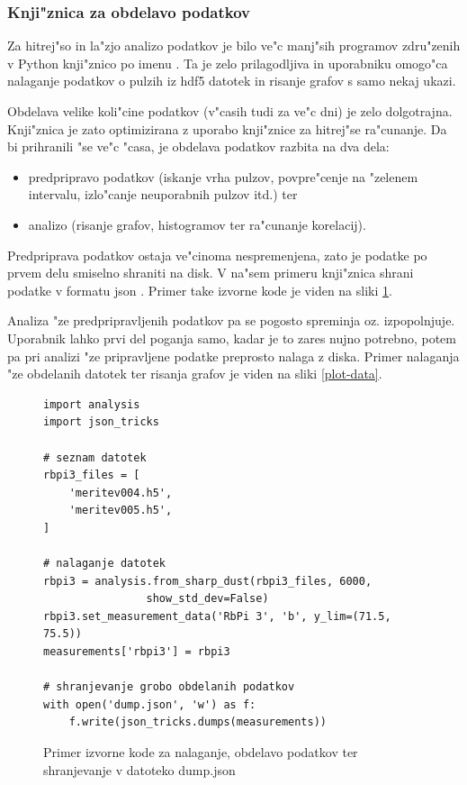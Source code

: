 \documentclass[11pt,a4paper]{article}
\begin{document}
\subsubsection{Knji"znica za obdelavo podatkov}
Za hitrej"so in la"zjo analizo podatkov je bilo ve"c manj"sih programov zdru"zenih v Python knji"znico po imenu . Ta je zelo prilagodljiva in uporabniku omogo"ca nalaganje podatkov o pulzih iz hdf5 \cite{hdf5} datotek in risanje grafov s samo nekaj ukazi.

Obdelava velike koli"cine podatkov (v"casih tudi za ve"c dni) je zelo dolgotrajna. Knji"znica  je zato optimizirana z uporabo knji"znice  za hitrej"se ra"cunanje. Da bi prihranili "se ve"c "casa, je obdelava podatkov razbita na dva dela:
\begin{itemize}
	\item predpripravo podatkov (iskanje vrha pulzov, povpre"cenje na "zelenem intervalu, izlo"canje neuporabnih pulzov itd.) ter
	\item analizo (risanje grafov, histogramov ter ra"cunanje korelacij).
\end{itemize}

Predpriprava podatkov ostaja ve"cinoma nespremenjena, zato je podatke po prvem delu smiselno shraniti na disk. V na"sem primeru knji"znica shrani podatke v formatu json \cite{json}. Primer take izvorne kode je viden na sliki \ref{dump-data}.

Analiza "ze predpripravljenih podatkov pa se pogosto spreminja oz. izpopolnjuje. Uporabnik lahko prvi del poganja samo, kadar je to zares nujno potrebno, potem pa pri analizi "ze pripravljene podatke preprosto nalaga z diska. Primer nalaganja "ze obdelanih datotek ter risanja grafov je viden na sliki \ref{plot-data}.

\begin{figure}[H]
	\begin{lstlisting}[frame=single]
import analysis
import json_tricks

# seznam datotek
rbpi3_files = [
	'meritev004.h5',
	'meritev005.h5',
]

# nalaganje datotek
rbpi3 = analysis.from_sharp_dust(rbpi3_files, 6000,
				show_std_dev=False)
rbpi3.set_measurement_data('RbPi 3', 'b', y_lim=(71.5, 75.5))
measurements['rbpi3'] = rbpi3

# shranjevanje grobo obdelanih podatkov
with open('dump.json', 'w') as f:
	f.write(json_tricks.dumps(measurements))
	\end{lstlisting}
	\caption{Primer izvorne kode za nalaganje, obdelavo podatkov ter shranjevanje v datoteko dump.json}
	\label{dump-data}
\end{figure}
\end{document}
